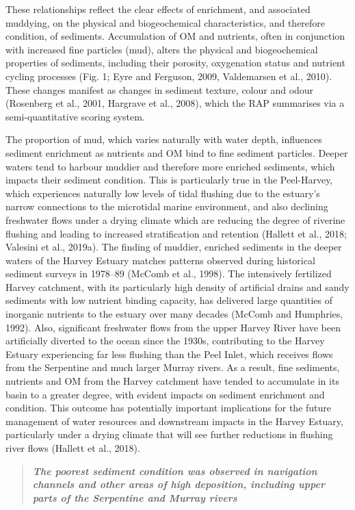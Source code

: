 \documentclass[
]{book}
\begin{document}
These relationships reflect the clear effects of enrichment, and associated muddying, on the physical and biogeochemical characteristics, and therefore condition, of sediments. Accumulation of OM and nutrients, often in conjunction with increased fine particles (mud), alters the physical and biogeochemical properties of sediments, including their porosity, oxygenation status and nutrient cycling processes (Fig. 1; Eyre and Ferguson, 2009, Valdemarsen et al., 2010). These changes manifest as changes in sediment texture, colour and odour (Rosenberg et al., 2001, Hargrave et al., 2008), which the RAP summarises via a semi-quantitative scoring system.

The proportion of mud, which varies naturally with water depth, influences sediment enrichment as nutrients and OM bind to fine sediment particles. Deeper waters tend to harbour muddier and therefore more enriched sediments, which impacts their sediment condition. This is particularly true in the Peel-Harvey, which experiences naturally low levels of tidal flushing due to the estuary's narrow connections to the microtidal marine environment, and also declining freshwater flows under a drying climate which are reducing the degree of riverine flushing and leading to increased stratification and retention (Hallett et al., 2018; Valesini et al., 2019a). The finding of muddier, enriched sediments in the deeper waters of the Harvey Estuary matches patterns observed during historical sediment surveys in 1978--89 (McComb et al., 1998). The intensively fertilized Harvey catchment, with its particularly high density of artificial drains and sandy sediments with low nutrient binding capacity, has delivered large quantities of inorganic nutrients to the estuary over many decades (McComb and Humphries, 1992). Also, significant freshwater flows from the upper Harvey River have been artificially diverted to the ocean since the 1930s, contributing to the Harvey Estuary experiencing far less flushing than the Peel Inlet, which receives flows from the Serpentine and much larger Murray rivers. As a result, fine sediments, nutrients and OM from the Harvey catchment have tended to accumulate in its basin to a greater degree, with evident impacts on sediment enrichment and condition. This outcome has potentially important implications for the future management of water resources and downstream impacts in the Harvey Estuary, particularly under a drying climate that will see further reductions in flushing river flows (Hallett et al., 2018).

\begin{quote}
\textbf{\emph{The poorest sediment condition was observed in navigation channels and other areas of high deposition, including upper parts of the Serpentine and Murray rivers}}
\end{quote}
\end{document}
